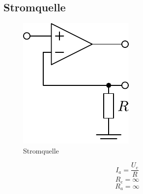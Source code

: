



\subsection{Stromquelle}
\begin{figure}[h!]
	\centering
	\includegraphics[scale=\schscale]{../fig/op_isource.pdf}
	\caption{Stromquelle}
	\label{sch:op-isource}
\end{figure}
\[ I_a = \frac{U_e}{R} \]
\[ R_e = \infty \]
\[ R_a = \infty \]
